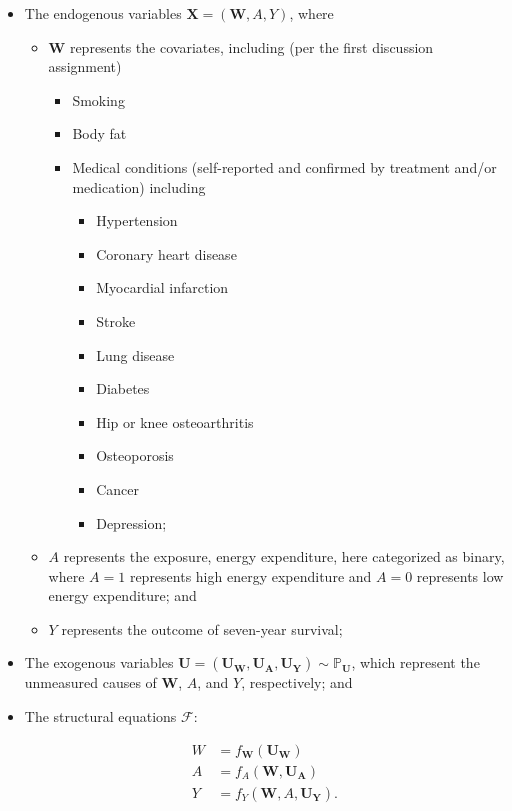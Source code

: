 \documentclass{article}\usepackage[]{graphicx}\usepackage[]{xcolor}
\begin{document}
\begin{enumerate}[label=\textbf{\arabic*.}]
\begin{enumerate}[label=\textbf{(\alph*)}]
\begin{itemize}
  \item The endogenous variables $\bm{X} = (\bm{W}, A, Y)$, where
  \begin{itemize}
    \item $\bm{W}$ represents the covariates, including (per the first discussion assignment)
    \begin{itemize}
      \item Smoking
      \item Body fat
      \item Medical conditions (self-reported and confirmed by treatment and/or medication) including
      \begin{itemize}
        \item Hypertension
        \item Coronary heart disease
        \item Myocardial infarction
        \item Stroke
        \item Lung disease
        \item Diabetes
        \item Hip or knee osteoarthritis
        \item Osteoporosis
        \item Cancer
        \item Depression;
      \end{itemize}
    \end{itemize}
    \item $A$ represents the exposure, energy expenditure, here categorized as binary, where $A=1$ represents high energy expenditure and $A=0$ represents low energy expenditure; and
    \item $Y$ represents the outcome of seven-year survival;
  \end{itemize}
  \item The exogenous variables $\bm{U} = (\bm{U_W}, \bm{U_A}, \bm{U_Y}) \sim \mathbb{P}_{\bm{U}}$, which represent the unmeasured causes of $\bm{W}$, $A$, and $Y$, respectively; and
  \item The structural equations $\mathcal{F}$:

\begin{align*}
W &= f_{\bm{W}}(\bm{U_W}) \\
A &= f_A(\bm{W},\bm{U_A}) \\
Y &= f_Y(\bm{W},A,\bm{U_Y}).
\end{align*}

\end{itemize}


\end{enumerate}
\end{enumerate}
\end{document}
